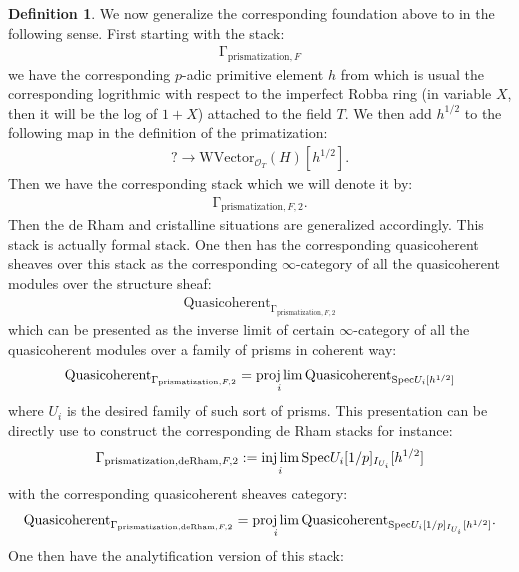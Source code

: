 \documentclass[12pt]{article}
\theoremstyle{definition}
\newtheorem{definition}{Definition}
\begin{document}
\begin{definition}
We now generalize the corresponding foundation above to \cite{BSB} in the following sense. First starting with the stack:
\begin{align}
\mathrm{\Gamma}_{\mathrm{prismatization},F}
\end{align}
we have the corresponding $p$-adic primitive element $h$ from \cite{BSB} which is usual the corresponding logrithmic with respect to the imperfect Robba ring (in variable $X$, then it will be the log of $1+X$) attached to the field $T$. We then add $h^{1/2}$ to the following map in the definition of the primatization:
\begin{align}
?\rightarrow \mathrm{WVector}_{\mathcal{O}_T}(H)[h^{1/2}].
\end{align}
Then we have the corresponding stack which we will denote it by:
\begin{align}
\mathrm{\Gamma}_{\mathrm{prismatization},F,2}.
\end{align}
Then the de Rham and cristalline situations are generalized accordingly. This stack is actually formal stack. One then has the corresponding quasicoherent sheaves over this stack as the corresponding $\infty$-category of all the quasicoherent modules over the structure sheaf:
\begin{align}
\mathrm{Quasicoherent}_{\mathrm{\Gamma}_{\mathrm{prismatization},F,2}}
\end{align}
which can be presented as the inverse limit of certain $\infty$-category of all the quasicoherent modules over a family of prisms in coherent way:
\begin{align}
\mathrm{Quasicoherent}_{\mathrm{\Gamma}_{\mathrm{prismatization},F,2}}=\projlim_i \mathrm{Quasicoherent}_{\mathrm{Spec}U_i[h^{1/2}]}
\end{align}
where $U_i$ is the desired family of such sort of prisms. This presentation can be directly use to construct the corresponding de Rham stacks for instance:
\begin{align}
\mathrm{\Gamma}_{\mathrm{prismatization},\mathrm{deRham},F,2}:=\injlim_i \mathrm{Spec}U_i[1/p]_{I_{U_i}}[h^{1/2}]
\end{align}
with the corresponding quasicoherent sheaves category:
\begin{align}
\mathrm{Quasicoherent}_{\mathrm{\Gamma}_{\mathrm{prismatization},\mathrm{deRham},F,2}}=\projlim_i \mathrm{Quasicoherent}_{\mathrm{Spec}U_i[1/p]_{I_{U_i}}[h^{1/2}]}.
\end{align}
One then have the analytification version of this stack:

\end{definition}
\end{document}
